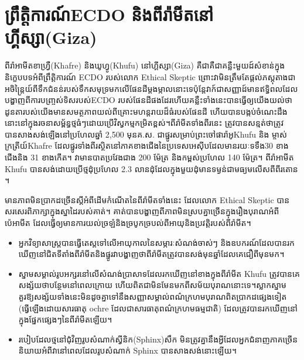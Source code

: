 \documentclass[10pt,twocolumn,letterpaper]{article}
\begin{document}
\section{ព្រឹត្តិការណ៍ECDO និងពីរ៉ាមីតនៅហ្គីស្សា(Giza)}

ពីរ៉ាអាមីតខាហ្វ្រឺ(Khafre) និងឃូហ្វូ(Khufu) នៅហ្គីស្សា(Giza) គឺជាគឺជាគន្លឺះមួយដ៍សំខាន់ក្នុងនិក្ខេបបទអំពីព្រឹត្តិការណ៍ ECDO របស់លោក Ethical Skeptic \cite{27} ព្រោះវាមិនត្រឹមតែផ្តល់ភស្តុតាងជាអចិន្ត្រៃយ៍ពីទឹកជំនន់របស់ទឹកសមុទ្រមកលើផែនដីម្តងម្កាលនោះទេប៉ុន្តែវាក៍ជាសញ្ញាដ៍មានឥទ្ធិពលដែលបង្ហាញពីការបញ្ច្រស់ទិសរបស់​ECDO របស់ផែនដីផងដែរ​ហើយគន្លឺះទាំងនេះបានធ្វើឲ្យយើងយល់ថាដូនតារបស់យើងមានសមត្ថភាពយល់ពីគ្រោះមហន្តរាយដ៏ធំរបស់ផែនដី ហើយបានបង្កប់ចំណេះដឹងនោះនៅក្នុងរចនាសម្ព័ន្ធថ្មធំៗដោយប្រើវិស្វកម្មកម្រិតខ្ពស់។ពីរ៉ាមីតទាំងពីរនេះ ត្រូវបានសន្មត់ថាត្រូវបានសាងសង់ឡើងនៅប្រហែលឆ្នាំ 2,500 មុនគ.ស. ជាផ្នូរសម្រាប់ព្រះចៅផារ៉ាអូ​Khufu និង ម្ចាស់ក្រត្រីយ៍​Khafre ដែលផ្នូរទាំងពីរស្ថិតនៅភាគខាងជើងនៃប្រទេសអេស៊ីបដែលមានរយៈទទឹង​30 ខាងជើងនិង 31 ខាងកើត។ វាមានបាតប្រវែងជាង 200 ម៉ែត្រ និងកម្ពស់ប្រហែល 140 ម៉ែត្រ។ ពីរ៉ាអាមីត Khufu បានសង់ដោយប្រើថ្មដុំប្រហែល 2.3 លានដុំដែលក្នុងមួយដុំមានទម្ងន់ជាមធ្យមលើសពីពីរតោន \cite{24, 25}។

មានភាពមិនប្រាកដច្រើនស្ដីអំពីដើមកំណើតនៃពីរ៉ាមីតទាំងនេះ ដែលលោក Ethical Skeptic បានសរសេរពិភាក្សាក្នុងស្នាដៃរបស់គាត់។ គាត់បានបង្ហាញពីភាពមិនស្របគ្នាច្រើនក្នុងរឿងបុរាណអំពីប៉េអាមីត ដែលធ្វើឲ្យមានការយល់ច្រឡំ​និង​ច្របូកច្របល់ពីអាយុនិងប្រវត្តិរបស់ពីរ៉ាមីត។

\begin{flushleft}
\begin{itemize}
    \item អ្នកវិទ្យាសាស្ត្របានធ្វើតេស្តទៅលើអាយុកាលនៃសម្ភារៈសំណង់ចាស់ៗ និងឧបករណ៍ដែលបានរកឃើញនៅជិតទីតាំងពីរ៉ាមីតនិងផ្នូរ​វាបង្ហាញថាពីរ៉ាមីតត្រូវបានសង់មុនឆ្នាំដែលគេជឿពីមុនមក។
    \item ស្នាមសម្គាល់​រូប​អក្សរ​នៅលើសំណង់ប្រាសាទដែលរកឃើញនៅខាងក្នុងពីរ៉ាមីត Khufu ត្រូវបានគេសង្ស័យថាបន្ថែមនៅពេលក្រោយ ហើយពិតជាមិនមែនមកពីសម័យបុរាណនោះទេ។ស្លាកស្នាមគួរឱ្យសង្ស័យទាំងនេះមិនដូចគ្នាទៅនឹងសញ្ញាសម្គាល់ពណ៌ក្រហមបុរាណពិតប្រាកដផ្សេងទៀត (ធ្វើឡើងដោយសារធាតុ ochre ដែលជាសារធាតុពណ៌ក្រហមធម្មជាតិ) ដែលត្រូវបានរកឃើញនៅក្នុងផ្នែកផ្សេងៗនៃពីរ៉ាមីតឡើយ។
    \item របៀបដែលថ្មនៅជុំវិញរូបសំណាក់ស្វីនិក(Sphinx)សឹក មិនត្រូវគ្នានឹងអ្វីដែលអ្នកជំនាញភាគច្រើននិយាយអំពីវានៅពេលដែលរូបសំណាក់ Sphinx បានសាងសង់នោះឡើយ។
\end{itemize}
\end{flushleft}
\end{document}
